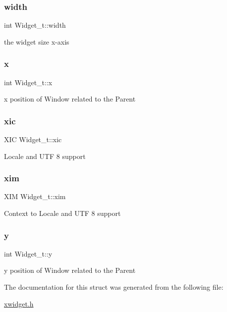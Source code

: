 \subsubsection{\texorpdfstring{width}{width}}
{\footnotesize\ttfamily int Widget\+\_\+t\+::width}

the widget size x-\/axis \mbox{\label{structWidget__t_aac6ce7621b682bb4ce88bac9181c34a7}} 
\subsubsection{\texorpdfstring{x}{x}}
{\footnotesize\ttfamily int Widget\+\_\+t\+::x}

x position of Window related to the Parent \mbox{\label{structWidget__t_adafb1b98ea551ef726be6c726ac2e817}} 
\subsubsection{\texorpdfstring{xic}{xic}}
{\footnotesize\ttfamily X\+IC Widget\+\_\+t\+::xic}

Locale and U\+TF 8 support \mbox{\label{structWidget__t_a81aa76d336043a7230844d09a92113e2}} 
\subsubsection{\texorpdfstring{xim}{xim}}
{\footnotesize\ttfamily X\+IM Widget\+\_\+t\+::xim}

Context to Locale and U\+TF 8 support \mbox{\label{structWidget__t_acb9402de44e47837e1821b93fc052b38}} 
\subsubsection{\texorpdfstring{y}{y}}
{\footnotesize\ttfamily int Widget\+\_\+t\+::y}

y position of Window related to the Parent 

The documentation for this struct was generated from the following file\+:\begin{DoxyCompactItemize}
\item 
\hyperlink{xwidget_8h}{xwidget.\+h}\end{DoxyCompactItemize}
